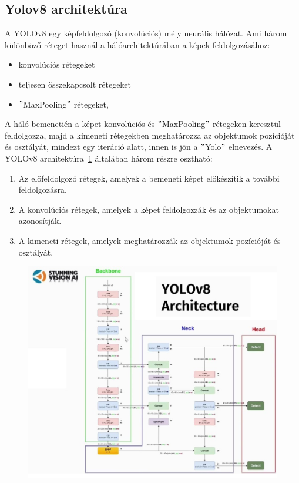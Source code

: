 \documentclass[12pt,oneside,a4paper]{article}
\theoremstyle{remark}
\begin{document}
	\subsection{Yolov8 architektúra}\label{subsec:yolov8-architektura}
	A YOLOv8 egy képfeldolgozó (konvolúciós) mély neurális hálózat.
	Ami három különböző réteget használ a hálóarchitektúrában a képek feldolgozásához:
	\begin{itemize}
		\item konvolúciós rétegeket
		\item teljesen összekapcsolt rétegeket
		\item \("\)MaxPooling\("\) rétegeket,
	\end{itemize}
	
	A háló bemenetién a képet  konvolúciós és \("\)MaxPooling\("\) rétegeken keresztül feldolgozza,
	majd a kimeneti rétegekben meghatározza az objektumok pozícióját és osztályát, mindezt egy iteráció alatt,
	innen is jön a \("\)\gls{Yolo}\("\) elnevezés.
	A YOLOv8 architektúra~\ref{fig:Yolov8} általában három részre osztható:
	\begin{enumerate}
		\item Az előfeldolgozó rétegek, amelyek a bemeneti képet előkészítik a további feldolgozásra.
		\item A konvolúciós rétegek, amelyek a képet feldolgozzák és az objektumokat azonosítják.
		\item A kimeneti rétegek, amelyek meghatározzák az objektumok pozícióját és osztályát.
	\end{enumerate}
	\newpage
	\begin{figure}[ht] %
		\centering
		\noindent\includegraphics[width=1\linewidth]{maxresdefault}
		\label{fig:Yolov8}
	\end{figure}
\end{document}

